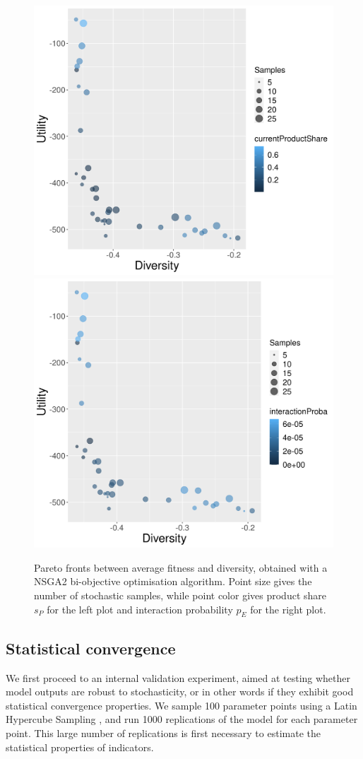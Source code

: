 \documentclass[letterpaper]{article}
\begin{document}
\begin{figure}[H]
\begin{center}
\includegraphics[width=0.48\linewidth]{figures/paretoDiversity-Fitness_colorcurrentProductShare.png}
\includegraphics[width=0.48\linewidth]{figures/paretoDiversity-Fitness_colorinteractionProba.png}\\
\caption{Pareto fronts between average fitness and diversity, obtained with a NSGA2 bi-objective optimisation algorithm. Point size gives the number of stochastic samples, while point color gives product share $s_P$ for the left plot and interaction probability $p_E$ for the right plot.}
\label{fig:fig2}
\end{center}
\end{figure}


\subsection{Statistical convergence}

We first proceed to an internal validation experiment, aimed at testing whether model outputs are robust to stochasticity, or in other words if they exhibit good statistical convergence properties. We sample 100 parameter points using a Latin Hypercube Sampling \citep{giunta2003overview}, and run 1000 replications of the model for each parameter point. This large number of replications is first necessary to estimate the statistical properties of indicators.
\end{document}

